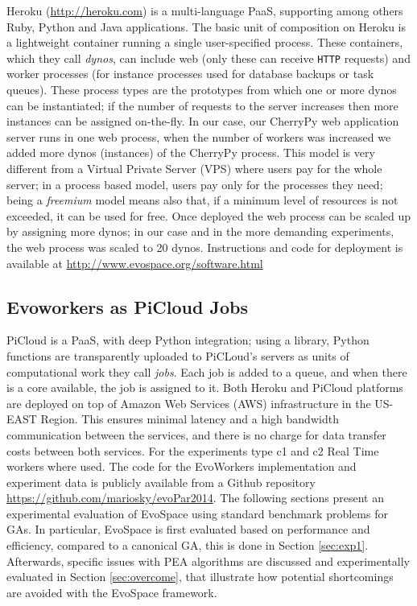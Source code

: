 Heroku (\url{http://heroku.com}) is a multi-language PaaS, supporting among others Ruby, Python and Java applications. The basic unit of composition on
Heroku is a lightweight container running a single user-specified
process. These containers, which they call {\em dynos}, can include web
(only these can receive {\tt HTTP} requests) and worker processes
(for instance processes used for database backups or task queues).
These  process types are the prototypes from which one or more dynos 
can be instantiated; if the number of requests to the server increases then 
more instances can be assigned on-the-fly. In our case, our CherryPy 
web application server runs in one web process, when the number 
of workers was increased we added more dynos (instances) of the 
CherryPy process. This model is very different from a Virtual Private Server (VPS) where users pay for the whole server; in a process based model, users pay only for the processes they need; being a {\em freemium} model means also that, if a minimum level of resources is not exceeded, it can be used for
free. 
Once deployed the web process can be scaled up by assigning more dynos;
in our case and in the more demanding experiments, the web process was scaled to 20 dynos. Instructions and code for deployment is available at \url{http://www.evospace.org/software.html} 


\subsection{Evoworkers as PiCloud Jobs}
PiCloud is a PaaS, with deep Python integration; 
using a library, Python functions are transparently uploaded to PiCLoud's 
servers as units of computational work they call \emph{jobs}. 
Each job is added to a queue, and when there is a core available, 
the job is assigned to it. Both Heroku and PiCloud 
platforms are deployed on top of Amazon Web Services (AWS) 
infrastructure in the US-EAST Region. This ensures minimal 
latency and a high bandwidth communication between the services, 
and there is no charge for data transfer costs between both services.
For the experiments type c1 and c2 Real Time workers where used.  
The code for the EvoWorkers implementation and experiment data is publicly available from a Github repository \url{https://github.com/mariosky/evoPar2014}. 
The following sections present an experimental evaluation of EvoSpace using standard benchmark problems for GAs.
In particular, EvoSpace is first evaluated based on performance and efficiency, compared to a canonical GA, this is done
in Section \ref{sec:exp1}.
Afterwards, specific issues with PEA algorithms are discussed and experimentally evaluated in Section \ref{sec:overcome},
that illustrate how potential shortcomings are avoided with the EvoSpace framework.


